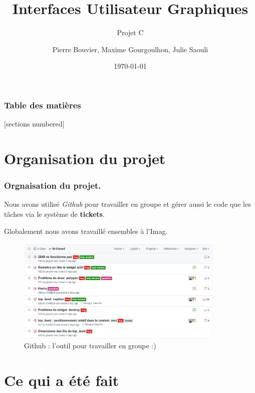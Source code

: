 \documentclass[10pt]{beamer}
\title{Interfaces Utilisateur Graphiques}
\subtitle{Projet C}
\date{\today}
\author{Pierre Bouvier, Maxime Gourgoulhon, Julie Saouli}
\institute{Ensimag}
\begin{document}
\maketitle

\begin{frame}
  \frametitle{Table des matières}
  [sections numbered]
  \tableofcontents[hideallsubsections]
\end{frame}

\section{Organisation du projet}

\begin{frame}[fragile]
	\frametitle{Orgnaisation du projet.}

    Nous avons utilisé \emph{Github} pour travailler en groupe et gérer aussi le code que les tâches via le système de \textbf{tickets}.

    Globalement nous avons travaillé ensembles à l'Imag.

    \begin{center}
    \begin{figure}
	   \includegraphics[width=10cm]{capture0.png}
    	\caption{Github : l'outil pour travailler en groupe :)}
    \end{figure}
    \end{center}

\end{frame}

\section{Ce qui a été fait}
\end{document}
